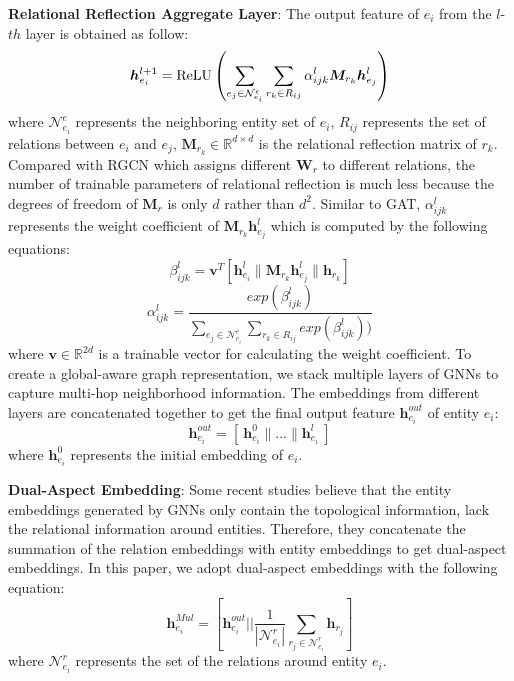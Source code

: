 \documentclass[sigconf,camera-ready]{acmart}
\begin{document}
\noindent
\textbf{Relational Reflection Aggregate Layer}:
The output feature of $e_i$ from the $l$-$th$ layer is obtained as follow:
\begin{equation}
\bm{h}_{e_i}^{l+1}={\rm ReLU}\left(\sum_{e_j\in \mathcal N_{e_i}^e}\sum_{r_k\in R_{ij}}\alpha_{ijk}^l \bm{M}_{r_k}\bm{h}_{e_j}^l\right)
\end{equation}
where $\mathcal N^e_{e_i}$ represents the neighboring entity set of $e_i$, $R_{ij}$ represents the set of relations between $e_i$ and $e_j$,
$\bm{M}_{r_k}\in\mathbb{R}^{d\times d}$ is the relational reflection matrix of $r_k$.
Compared with RGCN which assigns different $\bm{W}_r$ to different relations, the number of trainable parameters of relational reflection is much less because the degrees of freedom of $\bm{M}_r$ is only $d$ rather than $d^2$.
Similar to GAT, $\alpha^l_{ijk}$ represents the weight coefficient of $\bm{M}_{r_k}\bm{h}_{e_j}^l$ which is computed by the following equations:
\begin{equation}
  \beta_{ijk}^l = \bm{v}^T[\bm{h}_{e_i}^l\|\bm{M}_{r_k}\bm{h}_{e_j}^l\|\bm{h}_{r_k}]
\end{equation}
\begin{equation}
\alpha_{ijk}^l=\frac{exp(\beta_{ijk}^l)}{\sum_{e_j\in \mathcal N^e_{e_i}}\sum_{r_k\in R_{ij}}exp(\beta_{ijk}^l))}
\end{equation}
where $\bm{v}\in \mathbb{R}^{2d}$ is a trainable vector for calculating the weight coefficient.
To create a global-aware graph representation, we stack multiple layers of GNNs to capture multi-hop neighborhood information.
The embeddings from different layers are concatenated together to get the final output feature $\bm{h}^{out}_{e_i}$ of entity $e_i$:
\begin{equation}
 \bm{h}^{out}_{e_i} = [\ \bm{h}^{0}_{e_i}\| ...\| \bm{h}^{l}_{e_i}\ ]
\end{equation}
where $\bm{h}^{0}_{e_i}$ represents the initial embedding of $e_i$.

\noindent
\textbf{Dual-Aspect Embedding}:
Some recent studies \cite{yang2019aligning,DBLP:conf/wsdm/MaoWXLW20} believe that the entity embeddings generated by GNNs only contain the topological information, lack the relational information around entities.
Therefore, they concatenate the summation of the relation embeddings with entity embeddings to get dual-aspect embeddings.
In this paper, we adopt dual-aspect embeddings with the following equation:
\begin{equation}
\bm{h}^{Mul}_{e_i}=\left[\bm{h}^{out}_{e_i}\Big|\Big|\frac1{|\mathcal N^r_{e_i}|}\sum_{r_j\in \mathcal N^r_{e_i}}\bm{h}_{r_j}\right]
\end{equation}
where $\mathcal N^r_{e_i}$ represents the set of the relations around entity $e_i$.
\end{document}
